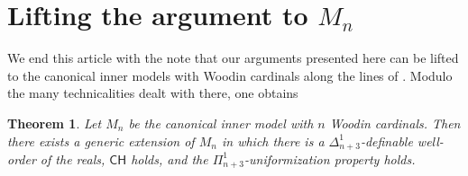 \documentclass[a4paper,11pt]{article}
\newtheorem{theorem}{Theorem}[section]
\begin{document}
\section{Lifting the argument to $M_n$} 
We end this article with the note that our arguments presented here can be lifted to the canonical inner models with Woodin cardinals along the lines of \cite{Ho2}. Modulo the many technicalities dealt with there, one obtains 
\begin{theorem}
Let \( M_n \) be the canonical inner model with \( n \) Woodin cardinals. Then there exists a generic extension of \( M_n \) in which there is a \( \Delta^1_{n+3} \)-definable well-order of the reals, \( \mathsf{CH} \) holds, and the \( \Pi^1_{n+3} \)-uniformization property holds.
\end{theorem}
\end{document}
